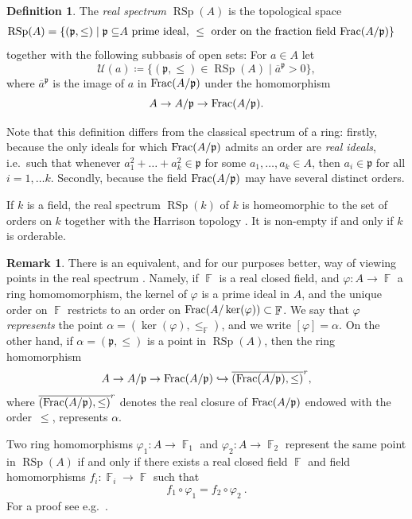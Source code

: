 \documentclass{amsart}
\theoremstyle{plain}
\theoremstyle{definition}
\newtheorem{definition}[proposition]{Definition}
\newtheorem{remark}[proposition]{Remark}
\DeclareMathOperator{\rsp}{RSp}
\DeclareMathOperator{\Fb}{{\mathbb{F}}}
\newcommand*\from{\colon}
\newcommand{\1}{\mathbf{1}}
\begin{document}
\begin{definition}
\label{dfn_RealSpectrum}
The \emph{real spectrum} $\rsp(A)$ is the topological space
\begin{align*}
\rsp(A) = \{ (\mathfrak{p},\leq) \mid \mathfrak{p} \subseteq &A \textrm{ prime ideal, }\leq \textrm{ order on the fraction field } \textnormal{Frac}(A/\mathfrak{p}) \}
\end{align*}
together with the following subbasis of open sets: For $a \in A$ let
\[ \mathcal{U}(a) \coloneqq \{ (\mathfrak{p}, \leq) \in \rsp(A) \mid \overline{a}^\mathfrak{p} >0\}, \]
where $\overline{a}^\mathfrak{p}$ is the image of $a$ in $\textnormal{Frac}(A/\mathfrak{p})$ under the homomorphism
\[ A \to A/\mathfrak{p} \to \textnormal{Frac}(A/\mathfrak{p}).\]
\end{definition}

Note that this definition differs from the classical spectrum of a ring: firstly, because the only ideals for which $\textnormal{Frac}(A/\mathfrak{p})$ admits an order are \emph{real ideals}, i.e.\ such that whenever $a_1^2 + \ldots +a_k^2 \in \mathfrak{p}$ for some $a_1,\ldots, a_k \in A$, then $a_i \in \mathfrak{p}$ for all $i=1,\ldots k$. Secondly, because the field $\textnormal{Frac}(A/\mathfrak{p})$ may have several distinct orders.

If $k$ is a field,  the real spectrum $\rsp(k)$ of $k$ is homeomorphic to the set of orders on $k$ together with the Harrison topology \cite[Example 7.1.4 a)]{BochnakCosteRoy_RealAlgebraicGeometry}.
It is non-empty if and only if $k$ is orderable.

\begin{remark}
There is an equivalent, and for our purposes better, way of viewing points in the real spectrum \cite[3.1.15]{Scheiderer_RAG}.
Namely, if $\Fb$ is a real closed field, and $\varphi \from A \to \Fb$ a ring homomomorphism, the kernel of $\varphi$ is a prime ideal in $A$, and the unique order on $\Fb$ restricts to an order on $\textnormal{Frac}(A/\ker(\varphi)) \subset \Fb$.
We say that $\varphi$ \emph{represents} the point $\alpha=(\ker(\varphi),\leq_{\Fb})$, and we write $[\varphi]=\alpha$.
On the other hand, if $\alpha=(\mathfrak{p}, \leq)$ is a point in $\rsp(A)$, then the ring homomorphism
\[A \to A/\mathfrak{p} \to \textnormal{Frac}(A/\mathfrak{p}) \hookrightarrow \overline{(\textnormal{Frac}(A/\mathfrak{p}),\leq)}^r,\]
where $\overline{(\textnormal{Frac}(A/\mathfrak{p}),\leq)}^r$ denotes the real closure of $\textnormal{Frac}(A/\mathfrak{p})$ endowed with the order~$\leq$, represents $\alpha$.

Two ring homomorphisms $\varphi_1 \colon A \to \Fb_1$ and $\varphi_2 \colon A \to \Fb_2$ represent the same point in $\rsp(A)$ if and only if there exists a real closed field $\Fb$ and field homomorphisms $f_i \colon \Fb_i \to \Fb$ such that
\[f_1\circ \varphi_1 = f_2 \circ \varphi_2~.\]
For a proof see e.g.\ \cite[Lemma 3.1.16]{Scheiderer_RAG}.
\end{remark}
\end{document}
